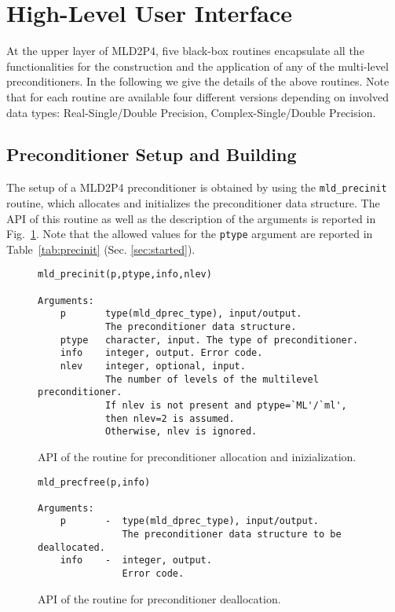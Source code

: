 \section{High-Level User Interface\label{sec:highlevel}}

At the upper layer of MLD2P4, five black-box routines encapsulate all the functionalities for the construction
and the application of any of the multi-level preconditioners.
In the following we give the details of the above routines. Note that for each routine are available four 
different versions depending on involved data types: Real-Single/Double Precision, Complex-Single/Double Precision.

\subsection{Preconditioner Setup and Building}\label{sec:setup}

The setup of a MLD2P4 preconditioner is obtained by using the \verb|mld_precinit| routine, which
allocates and initializes the preconditioner data structure.
The API of this routine as well as the description of the arguments is reported in Fig.~\ref{fig:prcinit}.
Note that the allowed values for the \verb|ptype| argument are reported in Table~\ref{tab:precinit} (Sec. \ref{sec:started}).
%
\begin{figure}[h]
\begin{center}
{\small
\begin{verbatim}
mld_precinit(p,ptype,info,nlev)

Arguments:
    p       type(mld_dprec_type), input/output. 
            The preconditioner data structure.
    ptype   character, input. The type of preconditioner. 
    info    integer, output. Error code.
    nlev    integer, optional, input. 
            The number of levels of the multilevel preconditioner.
            If nlev is not present and ptype=`ML'/`ml', 
            then nlev=2 is assumed. 
            Otherwise, nlev is ignored.
\end{verbatim}
}
\end{center}
\caption{API of the routine for preconditioner allocation and inizialization.\label{fig:prcinit}}
\end{figure}
%
%
\begin{figure}[h]
\begin{center}
{\small
\begin{verbatim}
mld_precfree(p,info)

Arguments:
    p       -  type(mld_dprec_type), input/output.
               The preconditioner data structure to be deallocated.
    info    -  integer, output.
               Error code.
\end{verbatim}
}
\end{center}
\caption{API of the routine for preconditioner deallocation.\label{fig:prcfree}}
\end{figure}


